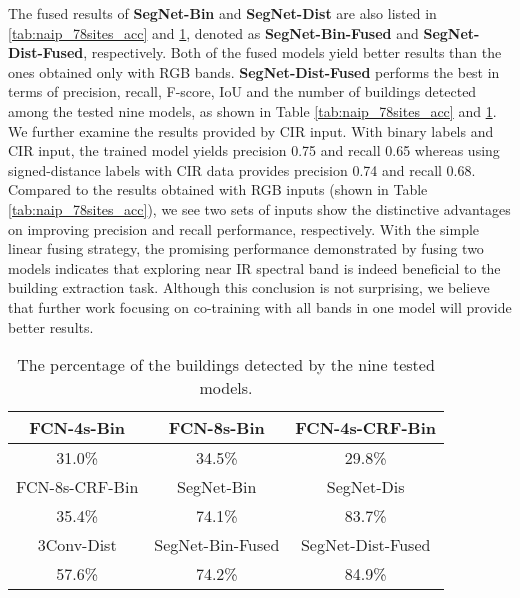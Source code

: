 \documentclass[journal]{IEEEtran}
\begin{document}
The fused results of \textbf{SegNet-Bin} and \textbf{SegNet-Dist} are also listed in \ref{tab:naip_78sites_acc} and \ref{tab:detRate}, denoted as \textbf{SegNet-Bin-Fused} and \textbf{SegNet-Dist-Fused}, respectively. Both of the fused models yield better results than the ones obtained only with RGB bands. \textbf{SegNet-Dist-Fused} performs the best in terms of precision, recall, F-score, IoU and the number of buildings detected among the tested nine models, as shown in Table \ref{tab:naip_78sites_acc} and \ref{tab:detRate}. We further examine the results provided by CIR input. With binary labels and CIR input, the trained model yields precision 0.75 and recall 0.65 whereas using signed-distance labels with CIR data provides precision 0.74 and recall 0.68. Compared to the results obtained with RGB inputs (shown in Table  \ref{tab:naip_78sites_acc}), we see two sets of inputs show the distinctive advantages on improving precision and recall performance, respectively. With the simple linear fusing strategy, the promising performance demonstrated by fusing two models indicates that exploring near IR spectral band is indeed beneficial to the building extraction task. Although this conclusion is not surprising, we believe that further work focusing on co-training with all bands in one model will provide better results.  
\begin{table}[ht!]
	\small
	\begin{tabular}{ccc}
		\hline\hline
		FCN-4s-Bin & FCN-8s-Bin & FCN-4s-CRF-Bin \\ \hline
		31.0\% & 34.5\% & 29.8\% \\ \hline\hline
		 FCN-8s-CRF-Bin & SegNet-Bin &SegNet-Dis \\ \hline
		 35.4\% &74.1\% &83.7\% \\ \hline\hline
		  3Conv-Dist & SegNet-Bin-Fused & SegNet-Dist-Fused\\ \hline
 57.6\%&74.2\% &84.9\%\\

		\hline
	\end{tabular}		
	\caption{The percentage of the buildings detected by the nine tested models. }\label{tab:detRate}
\end{table}
\end{document}
